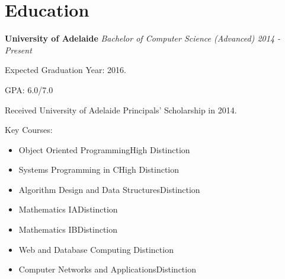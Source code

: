\documentclass[10pt,oneside,a4paper]{article}
\newcommand{\info}[2] 
{
    {
        \section*{#1}
        \hrulefill\newline
    }

    {#2}
}
\begin{document}
\info{Education}
{
    \textbf{University of Adelaide}\newline
    \emph{Bachelor of Computer Science (Advanced) \hfill 2014 - Present}
    \begin{description}[leftmargin=0.5cm, itemindent=0cm]
        \item Expected Graduation Year: 2016.
        \item GPA: 6.0/7.0
        \item Received University of Adelaide Principals' Scholarship in 2014.
        \item Key Courses:
            \begin{itemize}
                \item Object Oriented Programming\dotfill High Distinction
                \item Systems Programming in C\dotfill High Distinction
                \item Algorithm Design and Data Structures\dotfill Distinction
                \item Mathematics IA\dotfill Distinction
                \item Mathematics IB\dotfill Distinction
                \item Web and Database Computing \dotfill Distinction
                \item Computer Networks and Applications\dotfill Distinction 
            \end{itemize}
    \end{description}
}
\end{document}

